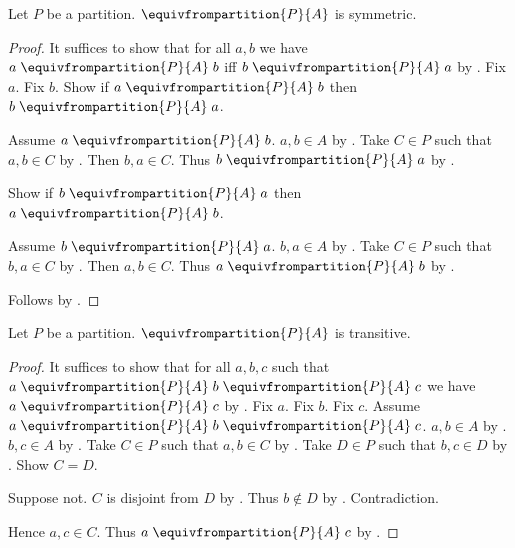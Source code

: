 \begin{proposition}\label{equivalence_from_partition_symmetric}
    Let $P$ be a partition.
    $\equivfrompartition{P}{A}$ is symmetric.
\end{proposition}
\begin{proof}
    It suffices to show that for all $a,b$ we have
        $a\mathrel{\equivfrompartition{P}{A}}b$ iff
        $b\mathrel{\equivfrompartition{P}{A}}a$
        by .
    Fix $a$.
    Fix $b$.
    Show if $a\mathrel{\equivfrompartition{P}{A}}b$ then
        $b\mathrel{\equivfrompartition{P}{A}}a$.
    \begin{subproof}
        Assume $a\mathrel{\equivfrompartition{P}{A}}b$.
        $a,b\in A$ by .
        Take $C\in P$ such that $a,b\in C$
            by .
        Then $b,a\in C$.
        Thus $b\mathrel{\equivfrompartition{P}{A}}a$
            by .
    \end{subproof}
    Show if $b\mathrel{\equivfrompartition{P}{A}}a$ then
        $a\mathrel{\equivfrompartition{P}{A}}b$.
    \begin{subproof}
        Assume $b\mathrel{\equivfrompartition{P}{A}}a$.
        $b,a\in A$ by .
        Take $C\in P$ such that $b,a\in C$
            by .
        Then $a,b\in C$.
        Thus $a\mathrel{\equivfrompartition{P}{A}}b$
            by .
    \end{subproof}
    Follows by \auto.
\end{proof}

\begin{proposition}\label{equivalence_from_partition_transitive}
    Let $P$ be a partition.
    $\equivfrompartition{P}{A}$ is transitive.
\end{proposition}
\begin{proof}
    It suffices to show that for all $a,b,c$ such that
        $a\mathrel{\equivfrompartition{P}{A}}b
        \mathrel{\equivfrompartition{P}{A}}c$
        we have $a\mathrel{\equivfrompartition{P}{A}}c$
        by .
    Fix $a$.
    Fix $b$.
    Fix $c$.
    Assume $a\mathrel{\equivfrompartition{P}{A}}b
        \mathrel{\equivfrompartition{P}{A}}c$.
    $a,b\in A$ by .
    $b,c\in A$ by .
    Take $C\in P$ such that $a,b\in C$
        by .
    Take $D\in P$ such that $b,c\in D$
        by .
    Show $C=D$.
    \begin{subproof}
        Suppose not.
        $C$ is disjoint from $D$ by .
        Thus $b\notin D$ by .
        Contradiction.
    \end{subproof}
    Hence $a,c\in C$.
    Thus $a\mathrel{\equivfrompartition{P}{A}}c$
        by .
\end{proof}

